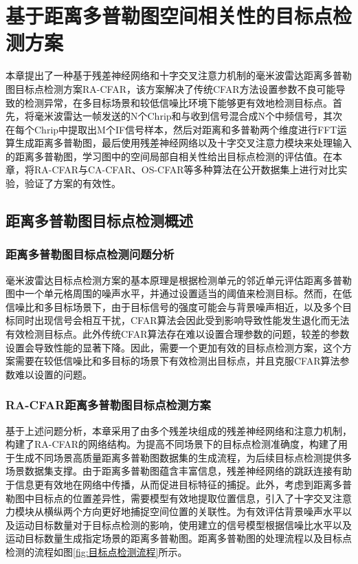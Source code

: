 \chapter{基于距离多普勒图空间相关性的目标点检测方案}
本章提出了一种基于残差神经网络和十字交叉注意力机制的毫米波雷达距离多普勒图目标点检测方案RA-CFAR，该方案解决了传统CFAR方法设置参数不良可能导致的检测异常，在多目标场景和较低信噪比环境下能够更有效地检测目标点。首先，将毫米波雷达一帧发送的N个Chrip和与收到信号混合成N个中频信号，其次在每个Chrip中提取出M个IF信号样本，然后对距离和多普勒两个维度进行FFT运算生成距离多普勒图，最后使用残差神经网络以及十字交叉注意力模块来处理输入的距离多普勒图，学习图中的空间局部自相关性给出目标点检测的评估值。在本章，将RA-CFAR与CA-CFAR、OS-CFAR等多种算法在公开数据集上进行对比实验，验证了方案的有效性。

\section{距离多普勒图目标点检测概述} \label{距离多普勒图目标点检测问题分析与方案设计}
\subsection{距离多普勒图目标点检测问题分析}

毫米波雷达目标点检测方案的基本原理是根据检测单元的邻近单元评估距离多普勒图中一个单元格周围的噪声水平，并通过设置适当的阈值来检测目标。然而，在低信噪比和多目标场景下，由于目标信号的强度可能会与背景噪声相近，以及多个目标同时出现信号会相互干扰，CFAR算法会因此受到影响导致性能发生退化而无法有效检测目标点。此外传统CFAR算法存在难以设置合理参数的问题，较差的参数设置会导致性能的显著下降。因此，需要一个更加有效的目标点检测方案，这个方案需要在较低信噪比和多目标的场景下有效检测出目标点，并且克服CFAR算法参数难以设置的问题。

\subsection{RA-CFAR距离多普勒图目标点检测方案}

基于上述问题分析，本章采用了由多个残差块组成的残差神经网络和注意力机制，构建了RA-CFAR的网络结构。为提高不同场景下的目标点检测准确度，构建了用于生成不同场景高质量距离多普勒图数据集的生成流程，为后续目标点检测提供多场景数据集支撑。由于距离多普勒图蕴含丰富信息，残差神经网络的跳跃连接有助于信息更有效地在网络中传播，从而促进目标特征的捕捉。此外，考虑到距离多普勒图中目标点的位置差异性，需要模型有效地提取位置信息，引入了十字交叉注意力\cite{huang2019ccnet}模块从横纵两个方向更好地捕捉空间位置的关联性。为有效评估背景噪声水平以及运动目标数量对于目标点检测的影响，使用建立的信号模型根据信噪比水平以及运动目标数量生成指定场景的距离多普勒图。距离多普勒图的处理流程以及目标点检测的流程如图\ref{fig:目标点检测流程}所示。

